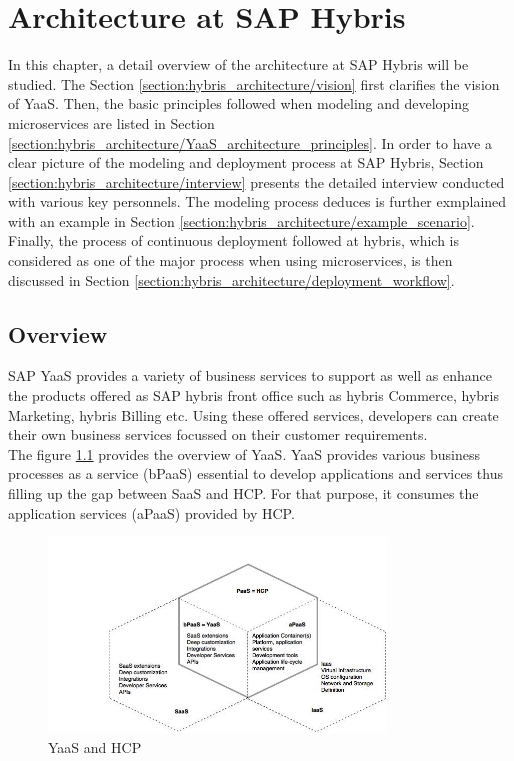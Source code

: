 \chapter{Architecture at SAP Hybris}\label{chapter:hybris_architecture}
In this chapter, a detail overview of the architecture at SAP Hybris will be studied. The Section \ref{section:hybris_architecture/vision} first clarifies the vision of \acrshort{YaaS}. Then, the basic principles followed when modeling and developing microservices are listed in Section \ref{section:hybris_architecture/YaaS_architecture_principles}. In order to have a clear picture of the modeling and deployment process at SAP Hybris, Section \ref{section:hybris_architecture/interview} presents the detailed interview conducted with various key personnels. The modeling process deduces is further exmplained with an example in Section \ref{section:hybris_architecture/example_scenario}. Finally, the process of continuous deployment followed at hybris, which is considered as one of the major process when using microservices, is then discussed in Section \ref{section:hybris_architecture/deployment_workflow}.
\section{Overview}\label{section:hybris_architecture/overview}
SAP \acrshort{YaaS} provides a variety of business services to support as well as enhance the products offered as SAP hybris front office such as hybris Commerce, hybris Marketing, hybris Billing etc. Using these offered services, developers can create their own business services focussed on their customer requirements.\\
The figure \ref{fig:hybris_architecture/overview/yaas_overview} provides the overview of \acrshort{YaaS}. \acrshort{YaaS} provides various business processes as a service (bPaaS) essential to develop applications and services thus filling up the gap between SaaS and HCP. For that purpose, it consumes the application services (aPaaS) provided by \acrshort{HCP}.
\begin{figure}[H]
\begin{center}
\includegraphics[width=0.8\textwidth]{figures/hybris-architecture-one}
\caption{\acrshort{YaaS} and \acrshort{HCP} \cite{Hirsch:2015aa}}
\label{fig:hybris_architecture/overview/yaas_overview}
\end{center}
\end{figure}
\\

